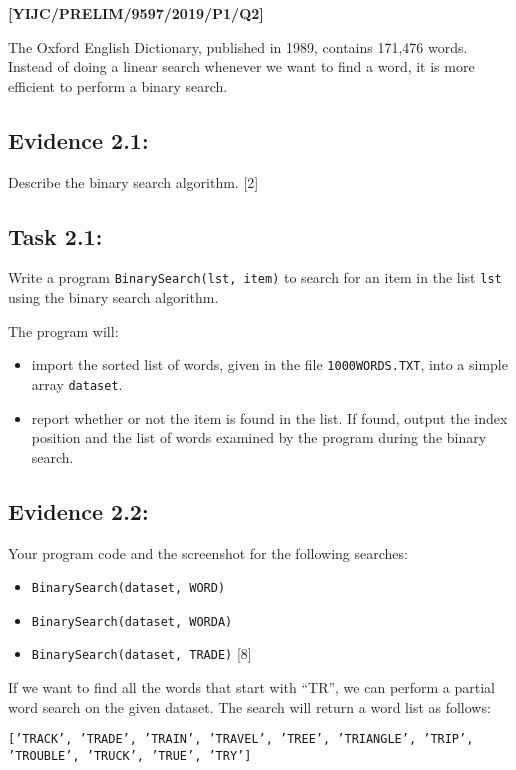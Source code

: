 \item \textbf{{[}YIJC/PRELIM/9597/2019/P1/Q2{]} }

The Oxford English Dictionary, published in 1989, contains 171,476
words. Instead of doing a linear search whenever we want to find a
word, it is more efficient to perform a binary search. 

\subsection*{Evidence 2.1: }

Describe the binary search algorithm. \hfill{}{[}2{]}

\subsection*{Task 2.1: }

Write a program \texttt{BinarySearch(lst, item)} to search for an
item in the list \texttt{lst} using the binary search algorithm. 

The program will:
\begin{itemize}
\item import the sorted list of words, given in the file \texttt{1000WORDS.TXT},
into a simple array \texttt{dataset}. 
\item report whether or not the item is found in the list. If found, output
the index position and the list of words examined by the program during
the binary search. 
\end{itemize}

\subsection*{Evidence 2.2:}

Your program code and the screenshot for the following searches: 
\begin{itemize}
\item \texttt{BinarySearch(dataset, \textquotedbl WORD\textquotedbl ) }
\item \texttt{BinarySearch(dataset, \textquotedbl WORDA\textquotedbl ) }
\item \texttt{BinarySearch(dataset, \textquotedbl TRADE\textquotedbl )}
\hfill{}{[}8{]}
\end{itemize}
If we want to find all the words that start with \textquotedblleft TR\textquotedblright ,
we can perform a partial word search on the given dataset. The search
will return a word list as follows: 
\noindent \begin{center}
\texttt{{[}'TRACK', 'TRADE', 'TRAIN', 'TRAVEL', 'TREE', 'TRIANGLE',
'TRIP', 'TROUBLE', 'TRUCK', 'TRUE', 'TRY'{]}}
\par\end{center}

